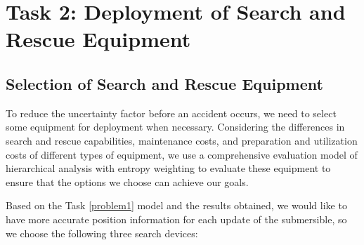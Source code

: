 \documentclass[12pt]{article}
\begin{document}
\begin{figure}[h!]
    \centering
\end{figure}

\section{Task 2: Deployment of Search and Rescue Equipment}

\subsection{Selection of Search and Rescue Equipment}

To reduce the uncertainty factor before an accident occurs, we need to select some equipment for deployment when necessary. Considering the differences in search and rescue capabilities, maintenance costs, and preparation and utilization costs of different types of equipment, we use a comprehensive evaluation model of hierarchical analysis with entropy weighting to evaluate these equipment to ensure that the options we choose can achieve our goals.

Based on the Task \ref{problem1} model and the results obtained, we would like to have more accurate position information for each update of the submersible, so we choose the following three search devices:
\end{document}
